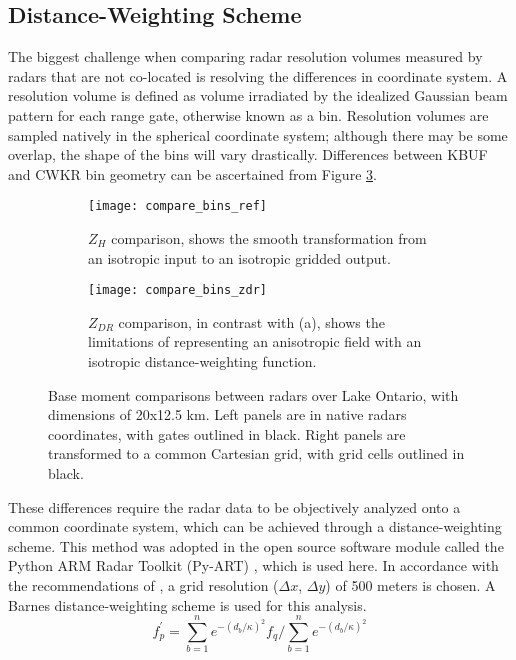 \subsection{Distance-Weighting Scheme}
The biggest challenge when comparing radar resolution volumes measured by radars that are not co-located is resolving the differences in coordinate system. A resolution volume is defined as volume irradiated by the idealized Gaussian beam pattern for each range gate, otherwise known as a bin. Resolution volumes are sampled natively in the spherical coordinate system; although there may be some overlap, the shape of the bins will vary drastically. Differences between KBUF and CWKR bin geometry can be ascertained from Figure \ref{fig:compare_bins}. 
\begin{figure}[H]
\centering
   \begin{subfigure}{1.0\textwidth} \centering
     \texttt{[image: compare\_bins\_ref]}
     \caption{$Z_H$ comparison, shows the smooth transformation from an isotropic input to an isotropic gridded output.}\label{fig:compare_ref}
   \end{subfigure}
   \begin{subfigure}{1.0\textwidth} \centering
     \texttt{[image: compare\_bins\_zdr]}
     \caption{$Z_{DR}$ comparison, in contrast with (a), shows the limitations of representing an anisotropic field with an isotropic distance-weighting function. }\label{fig:compare_zdr}
   \end{subfigure}
\caption{Base moment comparisons between radars over Lake Ontario, with dimensions of 20x12.5 km. Left panels are in native radars coordinates, with gates outlined in black. Right panels are transformed to a common Cartesian grid, with grid cells outlined in black.} \label{fig:compare_bins}
\end{figure}
These differences require the radar data to be objectively analyzed onto a common coordinate system, which can be achieved through a distance-weighting scheme. This method was adopted in the open source software module called the Python ARM Radar Toolkit (Py-ART) \citep{Py-ART}, which is used here. In accordance with the recommendations of \cite{Pauly1990}, a grid resolution ($\Delta x$, $\Delta y$) of 500 meters is chosen. A Barnes distance-weighting scheme is used for this analysis. 
\begin{equation}\label{eq:barnesdws}
f^{'}_{p} = \sum_{b=1}^n  e^{-(d_b/\kappa)^{2}} f_q  \bigg/ \sum_{b=1}^n e^{-(d_b/\kappa)^{2}}
\end{equation}

